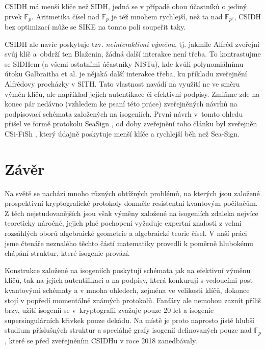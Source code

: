 \documentclass[12pt]{report}
\begin{document}
CSIDH má menší klíče než SIDH, jedná se v případě obou účastníků o jediný prvek $\mathbb{F}_p$. Aritmetika čísel nad $\mathbb{F}_p$ je též mnohem rychlejší, než ta nad $\mathbb{F}_{p^2}$, CSIDH bez optimizací může se SIKE na tomto poli soupeřit taky. 

CSIDH ale navíc poskytuje tzv. \textit{neinteraktivní výměnu}, tj. jakmile Alfréd zveřejní svůj klíč a~obdrží ten Blaženin, žádná další interakce není třeba. To kontrastujme se SIDHem (a všemi ostatními účastníky NISTu), kde kvůli polynomiálnímu útoku Galbraitha et al. je nějaká další interakce třeba, ku příkladu zveřejnění Alfrédovy procházky v SITH. Tato vlastnost navádí na využití ne ve směru výměn klíčů, ale například jejich autentikace či efektivní podpisy. Zmiňme zde na konec pár nedávno (vzhledem ke psaní této práce) zveřejněných návrhů na podpisovací schémata založených na isogeniích. První návrh v~tomto ohledu přišel ve formě protokolu SeaSign \cite{SeaSign}, od doby zveřejnění toho článku byl zveřejněn CSi-FiSh \cite{CSIFISH}, který údajně poskytuje menší klíče a rychlejší běh než Sea-Sign. 


\chapter*{Závěr}

Na světě se nachází mnoho různých obtížných problémů, na kterých jsou založené prospektivní kryptografické protokoly domněle resistentní kvantovým počítačům. Z těch nejstudovanějších jsou však výměny založené na isogeniích zdaleka nejvíce teoreticky náročné, jejich plné pochopení vyžaduje expertní znalosti z velmi rozsáhlých oborů algebraické geometrie a algebraické teorie čísel. V naší práci jsme čtenáře neznalého těchto částí matematiky provedli k poměrně hlubokému chápání struktur, které isogenie provází.

Konstrukce založené na isogeniích poskytují schémata jak na efektivní výměnu klíčů, tak na jejich autentifikaci a na podpisy, která konkurují s vedoucími post-kvantovými schématy a v mnoha ohledech, zejména ve velikosti klíčů, dokonce stojí v popředí momentálně známých protokolů. Fanfáry ale nemohou zaznít příliš brzy, užití isogenií se v~kryptografii zvažuje pouze 20 let a isogenie supersingulárních křivkek pouze dekádu. Na místě je proto naprosto jistě hlubší studium příslušných struktur a speciálně grafy isogenií definovaných pouze nad $\mathbb{F}_p$, které se před zveřejněním CSIDHu v roce 2018 zanedbávaly. 
\end{document}

